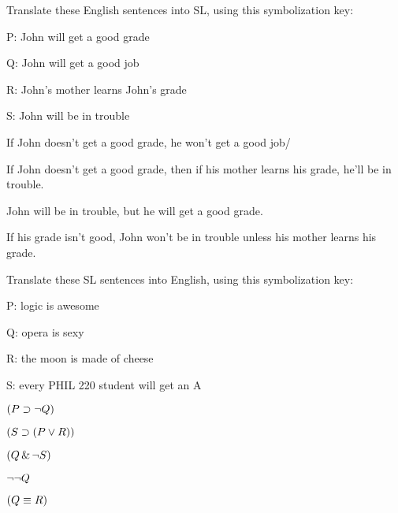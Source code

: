 \problempart
\label{HW2.C}
Translate these English sentences into SL, using this symbolization key:
\begin{ekey}
\item[P:] John will get a good grade
\item[Q:] John will get a good job
\item[R:] John's mother learns John's grade
\item[S:] John will be in trouble
\end{ekey}
	\begin{earg}
		\item If John doesn’t get a good grade, he won’t get a good job/
		\item If John doesn’t get a good grade, then if his mother learns his grade, he’ll be in
trouble.
		\item John will be in trouble, but he will get a good grade.
		\item If his grade isn't good, John won't be in trouble unless his mother learns his grade.
	\end{earg}

	
\problempart
\label{HW2.D}

Translate these SL sentences into English, using this symbolization key:
\begin{ekey}
\item[P:] logic is awesome
\item[Q:] opera is sexy
\item[R:] the moon is made of cheese
\item[S:] every PHIL 220 student will get an A
\end{ekey}
	\begin{earg}
		\item $(P \supset \neg Q)$
		\item $(S \supset (P \vee R))$
		\item $(Q \,\&\, \neg S)$
		\item $\neg \neg Q$
		\item $(Q \equiv R)$
	\end{earg}
	

